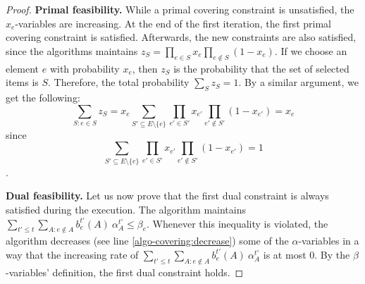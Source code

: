\begin{proof}

\textbf{Primal feasibility.}
While a primal covering constraint is unsatisfied, the $x_e$-variables are increasing. At the end of the first iteration, the first primal covering constraint is satisfied. Afterwards, the new constraints are
also satisfied, since the algorithms maintains $z_{S} = \prod_{e \in S} x_{e} \prod_{e \notin S} (1 - x_{e})$.
If we choose an element $e$ with probability $x_{e}$, then $z_{S}$ is the probability
that the set of selected items is $S$. Therefore, the total probability $\sum_{S} z_{S} = 1$. By a similar argument, we get the following:
\[
	\sum_{S: e \in S} z_{S} = x_{e} \sum_{S' \subseteq E \setminus \{e\}} \prod_{e' \in S'} x_{e'} \prod_{e' \notin S'} (1 - x_{e'}) = x_{e}
\]
since
\[
	\sum_{S' \subseteq E \setminus \{e\}} \prod_{e' \in S'} x_{e'} \prod_{e' \notin S'} (1 - x_{e'}) = 1
\].

\textbf{Dual feasibility.} Let us now prove that the first dual constraint is always satisfied during the execution. The algorithm maintains $\sum_{t' \le t} \sum_{A: e \notin A} b^{t'}_{e}(A)\ \alpha^{t'}_{A} \leq \beta_{e}$. %
Whenever this inequality is violated, the algorithm decreases (see line \ref{algo-covering:decrease}) some of the $\alpha$-variables in a way that the increasing rate of $\sum_{t' \le t} \sum_{A: e \notin A} b^{t'}_{e}(A)\ \alpha^{t'}_{A}$ is at most 0. By the $\beta$-variables' definition, the first dual constraint holds.


\end{proof}

